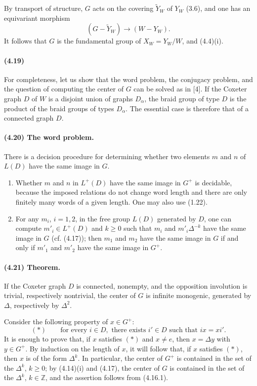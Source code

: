 \documentclass[10pt]{article}
\newcommand{\Z}{\mathbb Z}
\begin{document}
By transport of structure, \(G\) acts on the covering \(\widetilde Y_W\) of \(Y_W\) (3.6), and one has an equivariant morphism
\[
(G-\widetilde Y_W)\longrightarrow (W-Y_W).
\]
It follows that \(G\) is the fundamental group of \(X_W=Y_W/W\), and (4.4)(i).

\paragraph{(4.19)} For completeness, let us show that the word problem, the conjugacy problem, and the question of computing the center of \(G\) can be solved as in [4]. If the Coxeter graph \(D\) of \(W\) is a disjoint union of graphs \(D_\alpha\), the braid group of type \(D\) is the product of the braid groups of types \(D_\alpha\). The essential case is therefore that of a connected graph \(D\).

\paragraph{(4.20) The word problem.} There is a decision procedure for determining whether two elements \(m\) and \(n\) of \(L(D)\) have the same image in \(G\).
\begin{enumerate}[label=\alph*)]
\item Whether \(m\) and \(n\) in \(L^+(D)\) have the same image in \(G^+\) is decidable, because the imposed relations do not change word length and there are only finitely many words of a given length. One may also use (1.22).
\item For any \(m_i\), \(i=1,2\), in the free group \(L(D)\) generated by \(D\), one can compute \(m'_i\in L^+(D)\) and \(k\ge0\) such that \(m_i\) and \(m'_i\Delta^{-k}\) have the same image in \(G\) (cf. (4.17)); then \(m_1\) and \(m_2\) have the same image in \(G\) if and only if \(m'_1\) and \(m'_2\) have the same image in \(G^+\).
\end{enumerate}

\paragraph{(4.21) Theorem.} If the Coxeter graph \(D\) is connected, nonempty, and the opposition involution is trivial, respectively nontrivial, the center of \(G\) is infinite monogenic, generated by \(\Delta\), respectively by \(\Delta^2\).

Consider the following property of \(x\in G^+\):
\[
(*)\qquad
\text{for every }i\in D,\text{ there exists }i'\in D\text{ such that }ix=xi'.
\]
It is enough to prove that, if \(x\) satisfies \((*)\) and \(x\ne e\), then \(x=\Delta y\) with \(y\in G^+\). By induction on the length of \(x\), it will follow that, if \(x\) satisfies \((*)\), then \(x\) is of the form \(\Delta^k\). In particular, the center of \(G^+\) is contained in the set of the \(\Delta^k\), \(k\ge0\); by (4.14)(i) and (4.17), the center of \(G\) is contained in the set of the \(\Delta^k\), \(k\in\Z\), and the assertion follows from (4.16.1).
\end{document}
